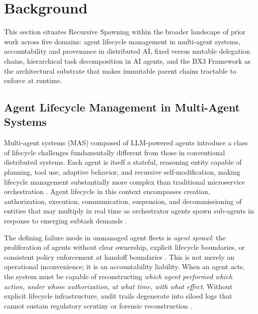 \section{Background}
\label{sec:background}

This section situates Recursive Spawning within the broader landscape of prior work across five domains: agent lifecycle management in multi-agent systems, accountability and provenance in distributed AI, fixed versus mutable delegation chains, hierarchical task decomposition in AI agents, and the BX3 Framework as the architectural substrate that makes immutable parent chains tractable to enforce at runtime.

\subsection{Agent Lifecycle Management in Multi-Agent Systems}

Multi-agent systems (MAS) composed of LLM-powered agents introduce a class of lifecycle challenges fundamentally different from those in conventional distributed systems. Each agent is itself a stateful, reasoning entity capable of planning, tool use, adaptive behavior, and recursive self-modification, making lifecycle management substantially more complex than traditional microservice orchestration \cite{alenezi2026}. Agent lifecycle in this context encompasses creation, authorization, execution, communication, suspension, and decommissioning of entities that may multiply in real time as orchestrator agents spawn sub-agents in response to emerging subtask demands \cite{moore2025hmas}.

The defining failure mode in unmanaged agent fleets is \textit{agent sprawl}: the proliferation of agents without clear ownership, explicit lifecycle boundaries, or consistent policy enforcement at handoff boundaries \cite{moore2025hmas}. This is not merely an operational inconvenience; it is an accountability liability. When an agent acts, the system must be capable of reconstructing \textit{which agent performed which action, under whose authorization, at what time, with what effect}. Without explicit lifecycle infrastructure, audit trails degenerate into siloed logs that cannot sustain regulatory scrutiny or forensic reconstruction \cite{provcagent2025, dzone2025accountability}.

